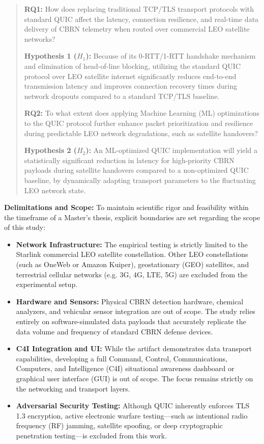 \begin{quote}
    \textbf{RQ1:} How does replacing traditional TCP/TLS transport protocols with standard QUIC affect the latency, connection resilience, and real-time data delivery of CBRN telemetry when routed over commercial LEO satellite networks?
    
    \textbf{Hypothesis 1 ($H_1$):} Because of its 0-RTT/1-RTT handshake mechanism and elimination of head-of-line blocking, utilizing the standard QUIC protocol over LEO satellite internet significantly reduces end-to-end transmission latency and improves connection recovery times during network dropouts compared to a standard TCP/TLS baseline.
    
    \vspace{0.5cm}
    
    \textbf{RQ2:} To what extent does applying Machine Learning (ML) optimizations to the QUIC protocol further enhance packet prioritization and resilience during predictable LEO network degradations, such as satellite handovers?
    
    \textbf{Hypothesis 2 ($H_2$):} An ML-optimized QUIC implementation will yield a statistically significant reduction in latency for high-priority CBRN payloads during satellite handovers compared to a non-optimized QUIC baseline, by dynamically adapting transport parameters to the fluctuating LEO network state.
\end{quote}

\par
\textbf{Delimitations and Scope:}
To maintain scientific rigor and feasibility within the timeframe of a Master's thesis, explicit boundaries are set regarding the scope of this study:
\begin{itemize}
    \item \textbf{Network Infrastructure:} The empirical testing is strictly limited to the Starlink commercial LEO satellite constellation. Other LEO constellations (such as OneWeb or Amazon Kuiper), geostationary (GEO) satellites, and terrestrial cellular networks (e.g. 3G, 4G, LTE, 5G) are excluded from the experimental setup.
    \item \textbf{Hardware and Sensors:} Physical CBRN detection hardware, chemical analyzers, and vehicular sensor integration are out of scope. The study relies entirely on software-simulated data payloads that accurately replicate the data volume and frequency of standard CBRN defense devices.
    \item \textbf{C4I Integration and UI:} While the artifact demonstrates data transport capabilities, developing a full Command, Control, Communications, Computers, and Intelligence (C4I) situational awareness dashboard or graphical user interface (GUI) is out of scope. The focus remains strictly on the networking and transport layers.
    \item \textbf{Adversarial Security Testing:} Although QUIC inherently enforces TLS 1.3 encryption, active electronic warfare testing—such as intentional radio frequency (RF) jamming, satellite spoofing, or deep cryptographic penetration testing—is excluded from this work.
\end{itemize}

\clearpage  %
